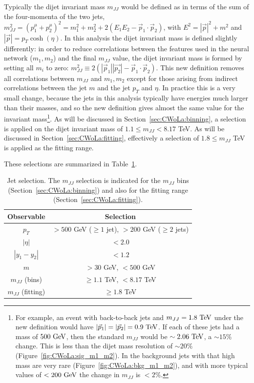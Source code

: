 Typically the dijet invariant mass $m_{JJ}$ would be defined as in terms of the sum of the four-momenta of the two jets, $m_{JJ}^2 = (p^\mu_1+p^\mu_2)^2 = m_1^2+m_2^2+2\left(E_1E_2-\vec{p}_1\cdot\vec{p}_2\right)$, with $E^2 = |\vec{p}|^2+m^2$ and $|\vec{p}| = p_T\cosh(\eta)$.
In this analysis the dijet invariant mass is defined slightly differently: in order to reduce correlations between the features used in the neural network ($m_1,m_2$) and the final $m_{JJ}$ value, the dijet invariant mass is formed by setting all $m_i$ to zero: $m_{JJ}^2 \equiv 2\left(|\vec{p}_1||\vec{p_2}|-\vec{p}_1\cdot\vec{p}_2\right)$.
This new definition removes all correlations between $m_{JJ}$ and $m_1,m_2$ except for those arising from indirect correlations between the jet $m$ and the jet $p_T$ and $\eta$.
In practice this is a very small change, because the jets in this analysis typically have energies much larger than their masses, and so the new definition gives almost the same value for the invariant mass\footnote{For example, an event with back-to-back jets and $m_{JJ}=1.8~\mathrm{TeV}$ under the new definition would have $|\vec{p}_1|=|\vec{p}_2|=0.9~\mathrm{TeV}$. If each of these jets had a mass of $500~\mathrm{GeV}$, then the standard $m_{JJ}$ would be $\sim2.06~\mathrm{TeV}$, a $\sim 15\%$ change. This is less than the dijet mass resolution of $\sim20\%$ (Figure~\ref{fig:CWoLa:sig_m1_m2}). In the background jets with that high mass are very rare (Figure~\ref{fig:CWoLa:bkg_m1_m2}), and with more typical values of $<200~\mathrm{GeV}$ the change in $m_{JJ}$ is $<2\%$.}.
As will be discussed in Section~\ref{sec:CWoLa:binning}, a selection is applied on the dijet invariant mass of $1.1 \le m_{JJ} < 8.17$ TeV.
As will be discussed in Section~\ref{sec:CWoLa:fitting}, effectively a selection of $1.8 \le m_{JJ}$ TeV is applied as the fitting range.

These selections are summarized in Table~\ref{tab:event_selection}.
\begin{table}[htbp]
  \begin{center}
    \caption{Jet selection. The $m_{JJ}$ selection is indicated for the $m_{JJ}$ bins (Section~\ref{sec:CWoLa:binning}) and also for the fitting range (Section~\ref{sec:CWoLa:fitting}).}
  \label{tab:event_selection}
    \begin{tabular}{c c}
      \hline
      Observable & Selection \\
      \hline
      $p_T$ & $>500$ GeV ($\ge 1$ jet), $>200$ GeV ($\ge 2$ jets) \\
      $|\eta|$ & $<2.0$ \\
      $|y_1-y_2|$ & $<1.2$ \\
      $m$ & $> 30$ GeV, $<500$ GeV \\
      $m_{JJ}$ (bins) & $\ge 1.1$ TeV, $<8.17$ TeV \\
      $m_{JJ}$ (fitting) & $\ge 1.8$ TeV \\
      \hline
    \end{tabular}
  \end{center}
\end{table}

